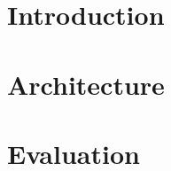 \documentclass{article}
\begin{document}
\maketitle

\begin{abstract}

\end{abstract}

\section{Introduction}



\section{Architecture}
\label{sec:architecture}

\section{Evaluation}
\label{sec:evaluation}


\end{document}
